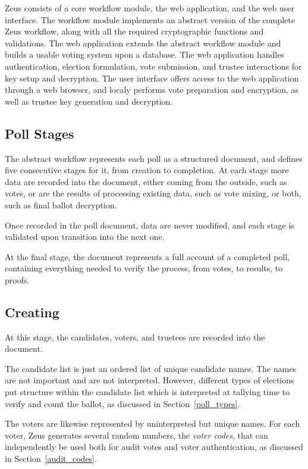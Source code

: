 \documentclass[letterpaper,twocolumn,10pt]{article}
\begin{document}
Zeus consists of a core workflow module, the web application,
and the web user interface.
The workflow module implements an abstract version of the complete Zeus
workflow, along with all the required cryptographic functions and
validations. The web application extends the abstract workflow module
and builds a usable voting system upon a database.
The web application handles authentication, election formulation, vote
submission, and trustee interactions for key setup and decryption.
The user interface offers access to the web application through
a web browser, and localy performs vote preparation and encryption,
as well as trustee key generation and decryption.

\subsection{Poll Stages}
The abstract workflow represents each poll as a structured document,
and defines five consecutive stages for it, from creation to completion.
At each stage more data are recorded into the document,
either coming from the outside, such as votes,
or are the results of processing existing data, such as vote mixing,
or both, such as final ballot decryption.

Once recorded in the poll document, data are never modified,
and each stage is validated upon transition into the next one.

At the final stage,
the document represents a full account of a completed poll,
containing everything needed to verify the process,
from votes, to results, to proofs.

\subsection{Creating}
At this stage, the candidates, voters, and trustees are recorded
into the document.

The candidate list is just an ordered list of unique candidate names.
The names are not important and are not interpreted. However,
different types of elections put structure within the candidate list
which is interpreted at tallying time to verify and count the ballot,
as discussed in Section~\ref{poll_types}.

The voters are likewise represented by uninterpreted but unique names.
For each voter,
Zeus generates several random numbers, the \emph{voter codes}, that can
independently be used both for audit votes and voter authentication,
as discussed in Section~\ref{audit_codes}.
\end{document}
